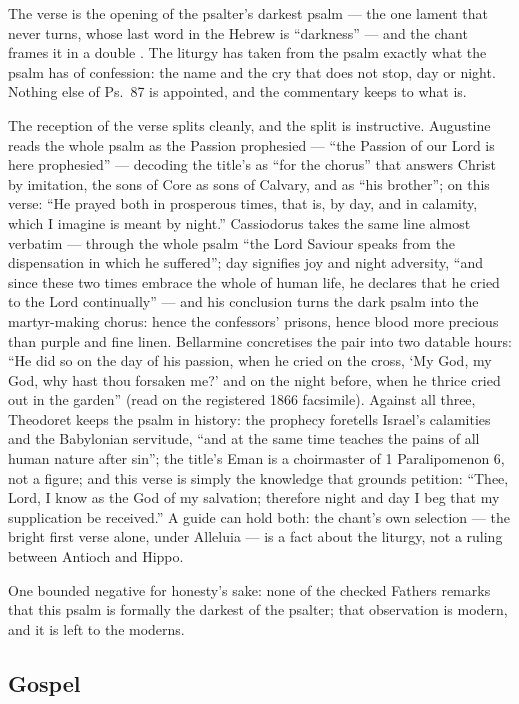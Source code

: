 The verse is the opening of the psalter's darkest psalm --- the one lament
that never turns, whose last word in the Hebrew is ``darkness'' --- and the
chant frames it in a double . The liturgy has taken from the
psalm exactly what the psalm has of confession: the name  and the cry that does not stop, day or night. Nothing else of Ps.~87 is
appointed, and the commentary keeps to what is.

The reception of the verse splits cleanly, and the split is instructive.
Augustine reads the whole psalm as the Passion prophesied --- ``the Passion
of our Lord is here prophesied'' --- decoding the title's  as ``for the chorus'' that answers Christ by imitation, the sons of
Core as sons of Calvary, and  as ``his brother''; on this verse:
``He prayed both in prosperous times, that is, by day, and in calamity,
which I imagine is meant by night.'' Cassiodorus takes the same line almost
verbatim --- through the whole psalm ``the Lord Saviour speaks from the
dispensation in which he suffered''; day signifies joy and night adversity,
``and since these two times embrace the whole of human life, he declares
that he cried to the Lord continually'' --- and his conclusion turns the
dark psalm into the martyr-making chorus: hence the confessors' prisons,
hence blood more precious than purple and fine linen. Bellarmine concretises
the pair into two datable hours: ``He did so on the day of his passion, when
he cried on the cross, `My God, my God, why hast thou forsaken me?' and on
the night before, when he thrice cried out in the garden'' (read on the
registered 1866 facsimile). Against all three, Theodoret keeps the psalm in
history: the prophecy foretells Israel's calamities and the Babylonian
servitude, ``and at the same time teaches the pains of all human nature
after sin''; the title's Eman is a choirmaster of 1 Paralipomenon 6, not a
figure; and this verse is simply the knowledge that grounds petition: ``Thee,
Lord, I know as the God of my salvation; therefore night and day I beg that
my supplication be received.'' A guide can hold both: the chant's own
selection --- the bright first verse alone, under Alleluia --- is a fact
about the liturgy, not a ruling between Antioch and Hippo.

One bounded negative for honesty's sake: none of the checked Fathers remarks
that this psalm is formally the darkest of the psalter; that observation is
modern, and it is left to the moderns.

\elementguard
\subsection*{Gospel }

